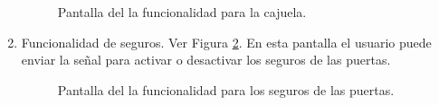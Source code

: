 \begin{enumerate}
\begin{figure}[H]
\centering
{}\hspace{5mm}
\caption{Pantalla del la funcionalidad para la cajuela.}
\label{cajuela}
\end{figure}

\item Funcionalidad de seguros. Ver Figura \ref{seguros}. En esta pantalla el usuario puede enviar la señal para activar o desactivar los seguros de las puertas.

\begin{figure}[H]
\centering
{}\hspace{5mm}
\caption{Pantalla del la funcionalidad para los seguros de las puertas.}
\label{seguros}
\end{figure}


\end{enumerate}
